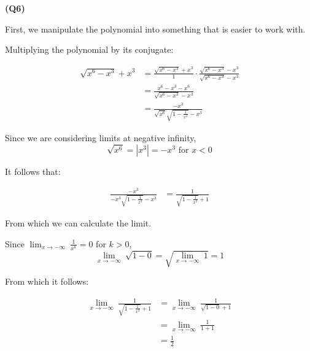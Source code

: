 \documentclass[12pt, a4paper]{article}
\newcommand{\displim}[1]{\displaystyle{\lim_{#1}\:}}
\begin{document}
\textbf{(Q6)}

First, we manipulate the polynomial into something that is easier to work with.

Multiplying the polynomial by its conjugate:

\begin{align*}
    \sqrt{x^6 - x^3} + x^3 & =
    \frac{\sqrt{x^6 - x^3} + x^3}{1} \cdot
    \frac{\sqrt{x^6 - x^3} - x^3}{\sqrt{x^6 - x^3} - x^3}\\
    & = \frac{x^6 - x^3 - x^6}{\sqrt{x^6 - x^3} - x^3}\\
    & = \frac{- x^3}{\sqrt{x^6}\sqrt{1 - \frac{1}{x^3}} - x^3}
\end{align*}

Since we are considering limits at negative infinity,
\[
    \sqrt{x^6} = \left|x^3\right| = -x^3 \text{ for $x < 0$}
\]

It follows that:

\begin{align*}
    \frac{- x^3}{-x^3\sqrt{1 - \frac{1}{x^3}} - x^3} & =
    \frac{1}{\sqrt{1 - \frac{1}{x^3}} + 1}
\end{align*}

From which we can calculate the limit.

Since $\displim{x \to -\infty} \frac{1}{x^k} = 0$ for $k > 0$,
\[
    \displim{x \to -\infty} \sqrt{1 - 0} = \sqrt{\displim{x \to -\infty} 1} = 1
\]

From which it follows:

\begin{align*}
    \displim{x \to -\infty} \frac{1}{\sqrt{1 - \frac{1}{x^3}} + 1} & =
    \displim{x \to -\infty} \frac{1}{\sqrt{1 - 0} + 1}\\
    & = \displim{x \to -\infty} \frac{1}{1 + 1}\\
    & = \frac{1}{2}
\end{align*}
\end{document}
